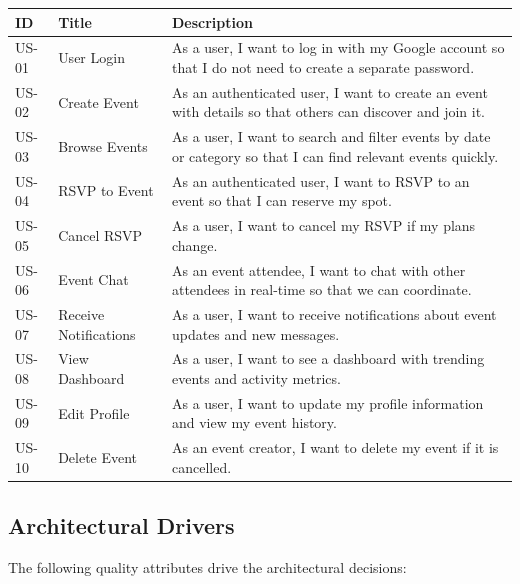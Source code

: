 \documentclass[12pt,a4paper]{article}
\begin{document}
\begin{longtable}{p{2cm}p{4cm}p{7cm}}
\toprule
\textbf{ID} & \textbf{Title} & \textbf{Description} \\
\midrule
\endhead
US-01 & User Login & As a user, I want to log in with my Google account so that I do not need to create a separate password. \\
\midrule
US-02 & Create Event & As an authenticated user, I want to create an event with details so that others can discover and join it. \\
\midrule
US-03 & Browse Events & As a user, I want to search and filter events by date or category so that I can find relevant events quickly. \\
\midrule
US-04 & RSVP to Event & As an authenticated user, I want to RSVP to an event so that I can reserve my spot. \\
\midrule
US-05 & Cancel RSVP & As a user, I want to cancel my RSVP if my plans change. \\
\midrule
US-06 & Event Chat & As an event attendee, I want to chat with other attendees in real-time so that we can coordinate. \\
\midrule
US-07 & Receive Notifications & As a user, I want to receive notifications about event updates and new messages. \\
\midrule
US-08 & View Dashboard & As a user, I want to see a dashboard with trending events and activity metrics. \\
\midrule
US-09 & Edit Profile & As a user, I want to update my profile information and view my event history. \\
\midrule
US-10 & Delete Event & As an event creator, I want to delete my event if it is cancelled. \\
\bottomrule
\end{longtable}

\subsection{Architectural Drivers}

The following quality attributes drive the architectural decisions:
\end{document}
